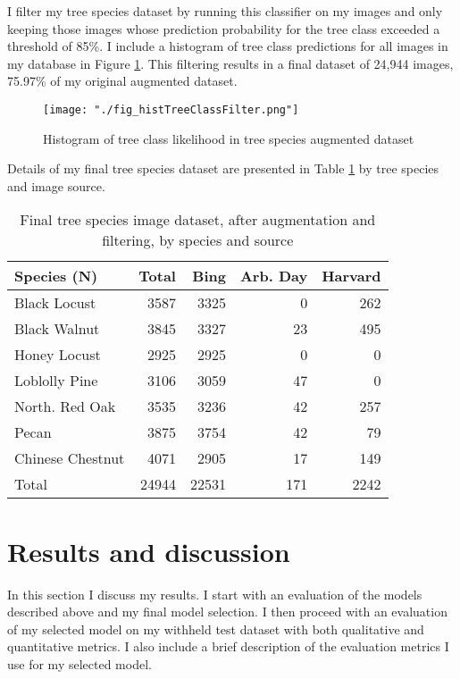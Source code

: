 \documentclass[10pt,twocolumn,letterpaper]{article}
\begin{document}
I filter my tree species dataset by running this classifier on my images and only keeping those images whose prediction probability for the tree class exceeded a threshold of 85\%. I include a histogram of tree class predictions for all images in my database in Figure \ref{fig:hist_tree_class}. This filtering results in a final dataset of 24,944 images, 75.97\% of my original augmented dataset.

\begin{figure}[!htbp]
  \centering
  \texttt{[image: "./fig\_histTreeClassFilter.png"]}
  \caption{\label{fig:hist_tree_class} Histogram of tree class likelihood in tree species augmented dataset}
\end{figure}


Details of my final tree species dataset are presented in Table \ref{tab:dataset_final}  by tree species and image source.

\begin{table}[!htbp]
  \begin{center}
    \small
  \begin{tabular}{|l|r|r|r|r|}
  \hline
  Species (N) & Total & Bing & Arb. Day & Harvard \\
  \hline\hline
  Black Locust & 3587 & 3325 & 0 & 262\\
   Black Walnut & 3845 & 3327 & 23 & 495\\
   Honey Locust & 2925 & 2925 & 0 & 0\\
   Loblolly Pine & 3106 & 3059 & 47 & 0\\
   North. Red Oak & 3535 & 3236 & 42 & 257\\
   Pecan & 3875 & 3754 & 42 & 79\\
   Chinese Chestnut & 4071 & 2905 & 17 & 149\\
   \hline\hline
   Total & 24944 & 22531 & 171 & 2242\\
  \hline
  \end{tabular}
  \end{center}
  \caption{\label{tab:dataset_final} Final tree species image dataset, after augmentation and filtering, by species and source}
  \end{table}

\section{Results and discussion}
\label{sec:results}
In this section I discuss my results. I start with an evaluation of the models described above and my final model selection. I then proceed with an evaluation of my selected model on my withheld test dataset with both qualitative and quantitative metrics. I also include a brief description of the evaluation metrics I use for my selected model. 
\end{document}
